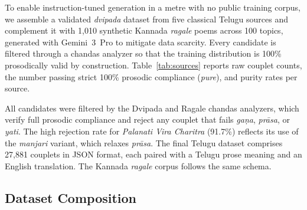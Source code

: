 \documentclass[11pt]{article}
\begin{document}
To enable instruction-tuned generation in a metre with no public training
corpus, we assemble a validated \textit{dvipada} dataset from five classical
Telugu sources and complement it with 1,010 synthetic Kannada
\textit{ragale} poems across 100 topics, generated with Gemini~3~Pro to
mitigate data scarcity. Every candidate is filtered through a chandas
analyzer so that the training distribution is 100\% prosodically valid by
construction. Table~\ref{tab:sources} reports raw couplet counts, the
number passing strict 100\% prosodic compliance (\textit{pure}), and purity
rates per source.

All candidates were filtered by the Dvipada and Ragale chandas analyzers,
which verify full prosodic compliance and reject any couplet that fails
\textit{ga\d{n}a}, \textit{pr\={a}sa}, or \textit{yati}. The high
rejection rate for \textit{Palanati Vira Charitra} (91.7\%) reflects its
use of the \textit{manjari} variant, which relaxes \textit{pr\={a}sa}.
The final Telugu dataset comprises 27,881 couplets in JSON format, each
paired with a Telugu prose meaning and an English translation. The
Kannada \textit{ragale} corpus follows the same schema.

\begin{table}[h!]
\centering
\small
{}
\caption{Dataset sources with raw couplet counts, master validated counts, and prosodic purity rates.}
\label{tab:sources}
\end{table}

\subsection{Dataset Composition}
\end{document}
